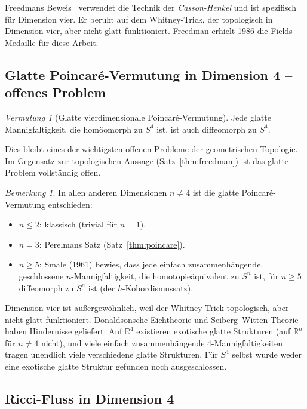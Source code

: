 \documentclass[12pt,a4paper]{amsart}
\theoremstyle{definition}
\theoremstyle{remark}
\newtheorem{bemerkung}[theorem]{Bemerkung}
\newtheorem{vermutung}[theorem]{Vermutung}
\newcommand{\R}{\mathbb{R}}
\begin{document}
Freedmans Beweis~\cite{Freedman1982} verwendet die Technik der
\emph{Casson-Henkel} und ist spezifisch für Dimension vier.  Er beruht auf
dem Whitney-Trick, der topologisch in Dimension vier, aber nicht glatt
funktioniert.  Freedman erhielt 1986 die Fields-Medaille für diese Arbeit.

\subsection{Glatte Poincaré-Vermutung in Dimension 4 -- offenes Problem}

\begin{vermutung}[Glatte vierdimensionale Poincaré-Vermutung]
\label{verm:s4d}
Jede glatte Mannigfaltigkeit, die homöomorph zu $S^4$ ist, ist auch
diffeomorph zu $S^4$.
\end{vermutung}

Dies bleibt eines der wichtigsten offenen Probleme der geometrischen
Topologie.  Im Gegensatz zur topologischen Aussage
(Satz~\ref{thm:freedman}) ist das glatte Problem vollständig offen.

\begin{bemerkung}
In allen anderen Dimensionen $n \neq 4$ ist die glatte Poincaré-Vermutung
entschieden:
\begin{itemize}
  \item $n \leq 2$: klassisch (trivial für $n=1$).
  \item $n = 3$: Perelmans Satz (Satz~\ref{thm:poincare}).
  \item $n \geq 5$: Smale (1961) bewies, dass jede einfach zusammenhängende,
    geschlossene $n$-Mannigfaltigkeit, die homotopieäquivalent zu $S^n$ ist,
    für $n \geq 5$ diffeomorph zu $S^n$ ist
    (der $h$-Kobordismussatz).
\end{itemize}
Dimension vier ist außergewöhnlich, weil der Whitney-Trick topologisch, aber
nicht glatt funktioniert.  Donaldsonsche Eichtheorie und Seiberg--Witten-Theorie
haben Hindernisse geliefert: Auf $\R^4$ existieren exotische glatte Strukturen
(auf $\R^n$ für $n \neq 4$ nicht), und viele einfach zusammenhängende
$4$-Mannigfaltigkeiten tragen unendlich viele verschiedene glatte Strukturen.
Für $S^4$ selbst wurde weder eine exotische glatte Struktur gefunden noch
ausgeschlossen.
\end{bemerkung}

\subsection{Ricci-Fluss in Dimension 4}
\end{document}
